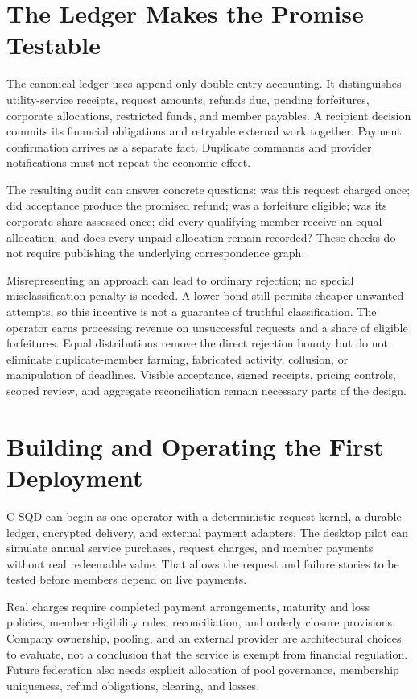 \documentclass[11pt]{article}
\begin{document}
\section{The Ledger Makes the Promise Testable}

The canonical ledger uses append-only double-entry accounting. It distinguishes
utility-service receipts, request amounts, refunds due, pending forfeitures, corporate allocations,
restricted funds, and member payables. A recipient decision commits its financial
obligations and retryable external work together. Payment confirmation arrives
as a separate fact. Duplicate commands and provider notifications must not repeat
the economic effect.

The resulting audit can answer concrete questions: was this request charged once;
did acceptance produce the promised refund; was a forfeiture eligible; was its
corporate share assessed once; did every qualifying member receive an equal
allocation; and does every unpaid allocation remain recorded? These checks do
not require publishing the underlying correspondence graph.

Misrepresenting an approach can lead to ordinary rejection; no special
misclassification penalty is needed. A lower bond still permits cheaper unwanted
attempts, so this incentive is not a guarantee of truthful classification.
The operator earns processing revenue on
unsuccessful requests and a share of eligible forfeitures. Equal distributions
remove the direct rejection bounty but do not eliminate duplicate-member farming,
fabricated activity, collusion, or manipulation of deadlines. Visible acceptance,
signed receipts, pricing controls, scoped review, and aggregate reconciliation
remain necessary parts of the design.

\section{Building and Operating the First Deployment}

C-SQD can begin as one operator with a deterministic request kernel, a durable
ledger, encrypted delivery, and external payment adapters. The desktop pilot
can simulate annual service purchases, request charges, and member payments without real redeemable value.
That allows the request and failure stories to be tested before members depend
on live payments.

Real charges require completed payment arrangements, maturity and loss policies,
member eligibility rules, reconciliation, and orderly closure provisions.
Company ownership, pooling, and an external provider are architectural choices
to evaluate, not a conclusion that the service is exempt from financial
regulation. Future federation also needs explicit allocation of pool governance,
membership uniqueness, refund obligations, clearing, and losses.
\end{document}
